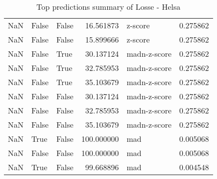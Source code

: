 \begin{table}[H]
\begin{tabular}{rllrlr}
         NaN &          False &       False &  16.561873 &      z-score &  0.275862 \\
         NaN &          False &       False &  15.899666 &      z-score &  0.275862 \\
         NaN &          False &        True &  30.137124 & madn-z-score &  0.275862 \\
         NaN &          False &        True &  32.785953 & madn-z-score &  0.275862 \\
         NaN &          False &        True &  35.103679 & madn-z-score &  0.275862 \\
         NaN &          False &       False &  30.137124 & madn-z-score &  0.275862 \\
         NaN &          False &       False &  32.785953 & madn-z-score &  0.275862 \\
         NaN &          False &       False &  35.103679 & madn-z-score &  0.275862 \\
         NaN &           True &       False & 100.000000 &          mad &  0.005068 \\
         NaN &          False &       False & 100.000000 &          mad &  0.005068 \\
         NaN &           True &       False &  99.668896 &          mad &  0.004548 \\
\bottomrule
\end{tabular}
\caption{Top predictions summary of Losse - Helsa}
\label{table:42960105-de-top-predictions-summary}
\end{table}
